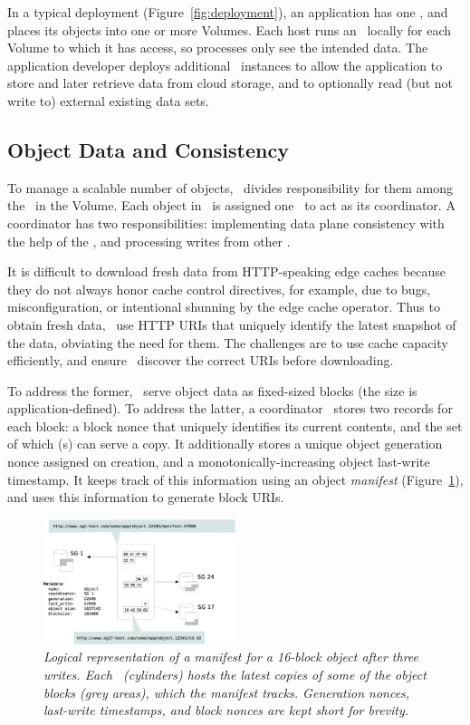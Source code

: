 In a typical deployment (Figure~\ref{fig:deployment}), an application 
has one \MS, and places its objects into one or more Volumes.
Each host runs an \SG\ locally for each Volume to which
it has access, so processes only see the intended data.
The application developer deploys additional \SG\ instances to
allow the application to store and later retrieve data from cloud
storage, and to optionally read (but not write to) external existing 
data sets.

\subsection{Object Data and Consistency}

To manage a scalable number of objects, \Syndicate\ divides
responsibility for them among the
\SGs\ in the Volume.  Each object in \Syndicate\ is assigned
one \SG\ to act as its coordinator.  A coordinator
has two responsibilities:  implementing data plane
consistency with the help of the \MS, and processing writes
from other \SGs.

It is difficult to download fresh data from HTTP-speaking
edge caches because they do not always honor cache control directives,
for example, due to bugs, misconfiguration, or intentional shunning by
the edge cache operator.  Thus to obtain fresh data, \SGs\ use HTTP
URIs that uniquely identify the latest snapshot of the data, obviating
the need for them.  The challenges are to use cache capacity efficiently,
and ensure \SGs\ discover the correct URIs before downloading.

To address the former, \SGs\ serve object data as fixed-sized blocks
(the size is application-defined).
To address the latter, a coordinator \SG\ stores two records for each block:  
a block nonce that uniquely identifies its current contents, and the set of which \SG(s)
can serve a copy.  It additionally stores a unique object
generation nonce assigned on creation, and a monotonically-increasing object
last-write timestamp.  It keeps track of this information using an object
\textit{manifest} (Figure~\ref{fig:manifest}), and uses this information
to generate block URIs.

\begin{figure}[h!]
\centering
\includegraphics[width=0.5\textwidth]{figures/manifest}
\caption{\it Logical representation of a manifest for a 16-block object after 
three writes.  Each \SG\ (cylinders) hosts the latest 
copies of some of the object blocks (grey areas), which the manifest tracks.  Generation nonces,
last-write timestamps, and block nonces are kept short for brevity.}
\label{fig:manifest}
\end{figure}

